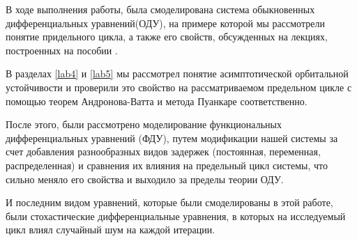 \Conclusion %
В ходе выполнения работы, была смоделирована система
обыкновенных дифференциальных уравнений(ОДУ), на примере которой
мы рассмотрели понятие придельного цикла, а
также его свойств, обсужденных на лекциях, построенных
на пособии \cite{bookdiff}.

В разделах \ref{lab4} и \ref{lab5} мы рассмотрел понятие асимптотической
орбитальной устойчивости и проверили это свойство на рассматриваемом
предельном цикле с помощью теорем Андронова-Ватта и метода
Пуанкаре соответственно.

После этого, были рассмотрено моделирование функциональных
дифференциальных уравнений (ФДУ), путем модификации
нашей системы за счет добавления разнообразных видов задержек
(постоянная, переменная, распределенная) и сравнения их влияния
на предельный цикл системы, что сильно меняло его свойства
и выходило за пределы теории ОДУ.

И последним видом уравнений, которые были смоделированы в
этой работе, были стохастические дифференциальные уравнения,
в которых на исследуемый цикл влиял случайный шум на каждой
итерации.

